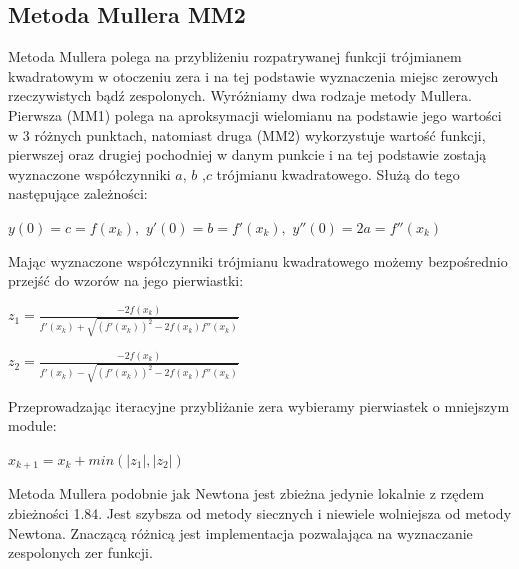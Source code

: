 \documentclass[a4paper, 11pt]{article}
\begin{document}
\subsection{Metoda Mullera MM2}
Metoda Mullera polega na przybliżeniu rozpatrywanej funkcji trójmianem kwadratowym w otoczeniu zera i na tej podstawie wyznaczenia miejsc zerowych rzeczywistych bądź zespolonych. Wyróżniamy dwa rodzaje metody Mullera. Pierwsza (MM1) polega na aproksymacji wielomianu na podstawie jego wartości w 3 różnych punktach, natomiast druga (MM2) wykorzystuje wartość funkcji, pierwszej oraz drugiej pochodniej w danym punkcie i na tej podstawie zostają wyznaczone współczynniki $a$, $b$ ,$c$ trójmianu kwadratowego. Służą do tego następujące zależności:
\begin{center}
$y(0) = c = f(x_{k}),$
$y'(0) = b = f'(x_{k}),$
$y''(0) = 2a = f''(x_{k})$
\end{center}
Mając wyznaczone współczynniki trójmianu kwadratowego możemy bezpośrednio przejść do wzorów na jego pierwiastki:
\begin{center}
$z_{1} = \frac{-2f(x_{k})}{f'(x_{k})+\sqrt{(f'(x_{k}))^2-2f(x_{k})f''(x_{k})}}$
\end{center}
\begin{center}
$z_{2} = \frac{-2f(x_{k})}{f'(x_{k})-\sqrt{(f'(x_{k}))^2-2f(x_{k})f''(x_{k})}}$
\end{center}
Przeprowadzając iteracyjne przybliżanie zera wybieramy pierwiastek o mniejszym module:
\begin{center}
$x_{k+1} = x_{k}+min(|z_{1}|,|z_{2}|)$
\end{center}
Metoda Mullera podobnie jak Newtona jest zbieżna jedynie lokalnie z rzędem zbieżności 1.84. Jest szybsza od metody siecznych i niewiele wolniejsza od metody Newtona. Znaczącą różnicą jest implementacja pozwalająca na wyznaczanie zespolonych zer funkcji. 
\end{document}
